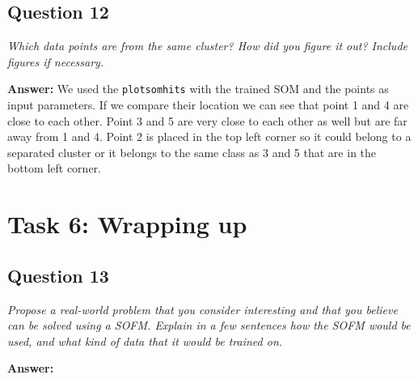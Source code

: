 \documentclass[a4paper]{article}
\begin{document}
\subsection*{Question 12}
\emph{Which data points are from the same cluster? How did you
figure it out? Include figures if necessary.} 

\textbf{Answer:} We used the \texttt{plotsomhits} with the trained SOM and the points as input parameters. If we compare their location we can see that point 1 and 4 are close to each other. Point 3 and 5 are very close to each other as well but are far away from 1 and 4. Point 2 is placed in the top left corner so it could belong to a separated cluster or it belongs to the same class as 3 and 5 that are in the bottom left corner.

\section*{Task 6: Wrapping up}

\subsection*{Question 13}
\emph{Propose a real-world problem that you consider interesting and
that you believe can be solved using a SOFM. Explain in a few sentences how the
SOFM would be used, and what kind of data that it would be trained on.}

\textbf{Answer:} 
\end{document}
